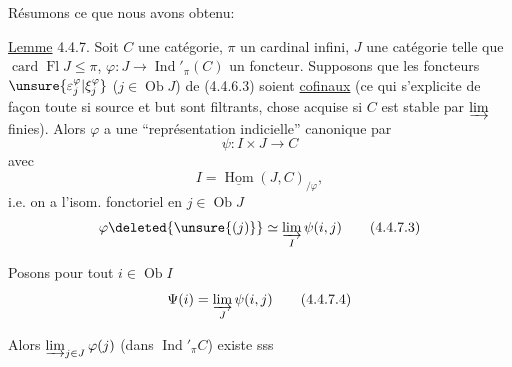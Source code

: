Résumons ce que nous avons obtenu:

\uline{Lemme} 4.4.7. Soit $C$ une  catégorie, $\pi$ un cardinal infini,  $J$ une    catégorie  telle que $\operatorname{card}\operatorname{Fl}J\leq\pi$, $\varphi:J\longrightarrow\operatorname{Ind}'_{\pi}(C)$ un foncteur. Supposons  que les  foncteurs $\unsure{\varepsilon_j^{\varphi}|\xi_j^{\varphi}}$ ($j\in\operatorname{Ob}J$) de (4.4.6.3) soient \uline{cofinaux} (ce qui s'explicite de façon toute  si source et but sont filtrants, chose acquise si $C$ est stable par $\varinjlim$ finies). Alors $\varphi$ a une ``représentation indicielle'' canonique  par
\[
\psi:I\times J\longrightarrow C\tag*{(4.4.7.1)}
\]
avec
\[
I=\underline{\operatorname{Hom}}(J,C)_{/\varphi},\tag*{(4.4.7.1)}
\]
i.e. on a l'isom. fonctoriel en $j\in\operatorname{Ob}J$
\[
\varphi\deleted{\unsure{(j)}}\simeq\varinjlim_I\psi(i,j)\tag*{(4.4.7.3)}
\]

Posons pour tout $i\in\operatorname{Ob}I$
\[
\Psi(i)=\varinjlim_J\psi(i,j)\tag*{(4.4.7.4)}
\]

Alors  $\varinjlim_{j\in J}\varphi(j)$ (dans $\operatorname{Ind}'_{\pi}C$) existe sss
